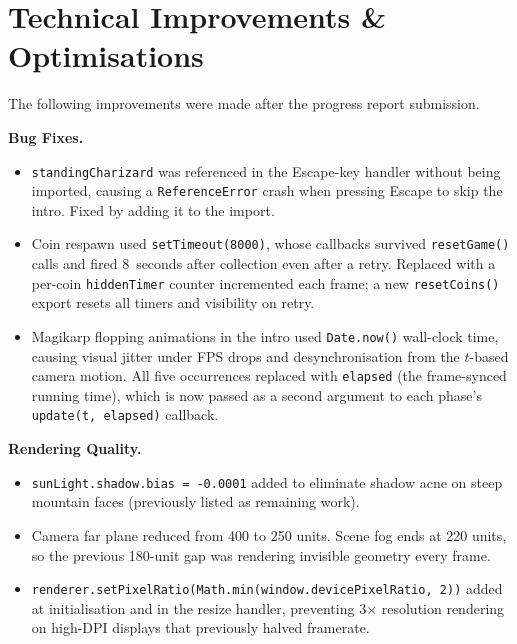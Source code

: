 \documentclass[11pt,a4paper]{article}
\begin{document}
\section{Technical Improvements \& Optimisations}

The following improvements were made after the progress report submission.

\medskip
\textbf{Bug Fixes.}
\begin{itemize}[leftmargin=*, itemsep=2pt]
    \item \texttt{standingCharizard} was referenced in the Escape-key handler
          without being imported, causing a \texttt{ReferenceError} crash when
          pressing Escape to skip the intro. Fixed by adding it to the import.
    \item Coin respawn used \texttt{setTimeout(8000)}, whose callbacks survived
          \texttt{resetGame()} calls and fired 8~seconds after collection even
          after a retry. Replaced with a per-coin \texttt{hiddenTimer} counter
          incremented each frame; a new \texttt{resetCoins()} export resets all
          timers and visibility on retry.
    \item Magikarp flopping animations in the intro used \texttt{Date.now()}
          wall-clock time, causing visual jitter under FPS drops and
          desynchronisation from the \(t\)-based camera motion. All five
          occurrences replaced with \texttt{elapsed} (the frame-synced running
          time), which is now passed as a second argument to each phase's
          \texttt{update(t, elapsed)} callback.
\end{itemize}

\medskip
\textbf{Rendering Quality.}
\begin{itemize}[leftmargin=*, itemsep=2pt]
    \item \texttt{sunLight.shadow.bias = -0.0001} added to eliminate shadow
          acne on steep mountain faces (previously listed as remaining work).
    \item Camera far plane reduced from 400 to 250 units. Scene fog ends at 220
          units, so the previous 180-unit gap was rendering invisible geometry
          every frame.
    \item \texttt{renderer.setPixelRatio(Math.min(window.devicePixelRatio, 2))}
          added at initialisation and in the resize handler, preventing 3\(\times\)
          resolution rendering on high-DPI displays that previously halved
          framerate.
\end{itemize}
\end{document}

